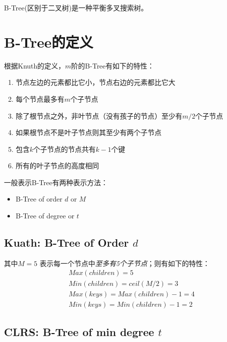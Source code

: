 \documentclass[12pt]{article}
\begin{document}
\makeblogtitle

B-Tree(区别于二叉树)是一种平衡多叉搜索树。

\section{B-Tree的定义}\label{b-treeux7684ux5b9aux4e49}

根据Knuth的定义，\({\displaystyle m}\)阶的B-Tree有如下的特性：

\begin{enumerate}
\tightlist
\item
  节点左边的元素都比它小，节点右边的元素都比它大
\item
  每个节点最多有\({\displaystyle m}\)个子节点
\item
  除了根节点之外，非叶节点（没有孩子的节点）至少有\({\displaystyle m/2}\)个子节点
\item
  如果根节点不是叶子节点则其至少有两个子节点
\item
  包含\({\displaystyle k}\)个子节点的节点共有\({\displaystyle k-1}\)个键
\item
  所有的叶子节点的高度相同
\end{enumerate}

一般表示B-Tree有两种表示方法：

\begin{itemize}
\tightlist
\item
  B-Tree of order \({\displaystyle d}\) or \({\displaystyle M}\)
\item
  B-Tree of degree or \({\displaystyle t}\)
\end{itemize}

\subsection{\texorpdfstring{Kuath: B-Tree of Order \({\displaystyle d}\)}{Kuath: B-Tree of Order \{\textbackslash displaystyle d\}}}\label{kuath-b-tree-of-order-displaystyle-d}

其中\({\displaystyle M=5}\) 表示每一个节点中\emph{至多有5个子节点}；则有如下的特性：
\begin{align}
&Max(children) = 5 \\
&Min(children) = ceil(M/2) = 3 \\
&Max(keys) = Max(children) - 1 = 4 \\
&Min(keys) = Min(children) - 1 = 2
\end{align}

\subsection{\texorpdfstring{CLRS: B-Tree of min degree \({\displaystyle t}\)}{CLRS: B-Tree of min degree \{\textbackslash displaystyle t\}}}\label{clrs-b-tree-of-min-degree-displaystyle-t}
\end{document}
